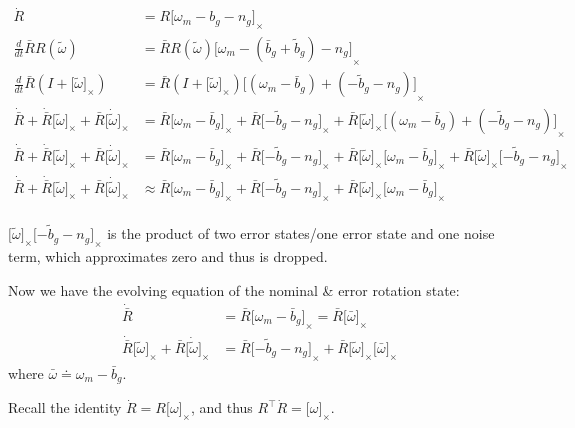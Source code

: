 \documentclass[letter,10pt]{article}
\newcommand{\asym}[1]{{\lbrack #1\rbrack}_\times{}}
\begin{document}
\begin{equation}
 \begin{aligned}
 \dot R &= R\asym{\omega_m-b_g-n_g} \\
 \frac{d}{dt}\bar R  R(\tilde \omega) &= \bar R R(\tilde \omega) \asym{\omega_m - (\bar b_g+\tilde b_g) - n_g} \\
 \frac{d}{dt}\bar R  (I+ \asym{\tilde\omega}) &= \bar R (I+ \asym{\tilde\omega}) \asym{(\omega_m - \bar b_g) + (-\tilde b_g-n_g)} \\
 \dot{\bar R} + \dot{\bar R} \asym{\tilde \omega} + \bar R \asym{\dot{\tilde\omega}}
 &= \bar R\asym{\omega_m-\bar b_g} + \bar R\asym{-\tilde b_g - n_g} + \bar R \asym{\tilde \omega}\asym{(\omega_m-\bar b_g) + (-\tilde b_g - n_g)}\\
 \dot{\bar R} + \dot{\bar R} \asym{\tilde \omega} + \bar R \asym{\dot{\tilde\omega}}
 &= \bar R\asym{\omega_m-\bar b_g} + \bar R\asym{-\tilde b_g - n_g} + \bar R \asym{\tilde \omega}\asym{\omega_m-\bar b_g} + \bar R \asym{\tilde \omega}\asym{-\tilde b_g - n_g}\\
 \dot{\bar R} + \dot{\bar R} \asym{\tilde \omega} + \bar R \asym{\dot{\tilde\omega}}
 &\approx \bar R\asym{\omega_m-\bar b_g} + \bar R\asym{-\tilde b_g - n_g} + \bar R \asym{\tilde \omega}\asym{\omega_m-\bar b_g}\\
 \end{aligned}
 \label{eq-rotation-derivation}
\end{equation}

$\asym{\tilde \omega}\asym{-\tilde b_g - n_g}$ is the product of two error states/one error state and one noise term, which approximates zero and thus is dropped.

Now we have the evolving equation of the nominal \& error rotation state:
\begin{equation}
\begin{aligned}
 \dot{\bar R} &= \bar R\asym{\omega_m - \bar b_g} = \bar R \asym{\bar \omega}\\
\dot{\bar R}\asym{\tilde\omega} + \bar R \asym{\dot{\tilde \omega}} 
&= \bar R \asym{-\tilde b_g - n_g} + \bar R\asym{\tilde\omega}\asym{\bar\omega}
\end{aligned}
\end{equation}
where $\bar \omega \doteq \omega_m - \bar b_g$.

Recall the identity $\dot R=R \asym{\omega}$, and thus $R^\top \dot R = \asym{\omega}$. 
\end{document}
